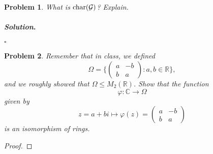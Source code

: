 \documentclass[reqno]{amsart}
\theoremstyle{plain}
\newtheorem{problem}{Problem}
\theoremstyle{definition}
\newenvironment{solution}{\paragraph{\emph{Solution}.}}{\hfill$\square$}
\begin{document}
\begin{problem}
What is ${\rm char}(\mathcal{G})$?  Explain.
\end{problem}
\begin{solution}

\end{solution}

\begin{problem}
Remember that in class, we defined
$$\Omega  = \Big\{ \begin{pmatrix}a & -b \\ b & a \end{pmatrix} : a,b \in \mathbb{R}\Big\},$$
and we roughly showed that $\Omega \le M_{2}(\mathbb{R})$.  Show that the function
$$\varphi: \mathbb{C} \rightarrow \Omega $$
given by
$$z = a + bi \mapsto \varphi(z) =  \begin{pmatrix}a & -b \\ b & a \end{pmatrix} $$
is an isomorphism of rings.
\end{problem}
\begin{proof}

\end{proof}
\end{document}
